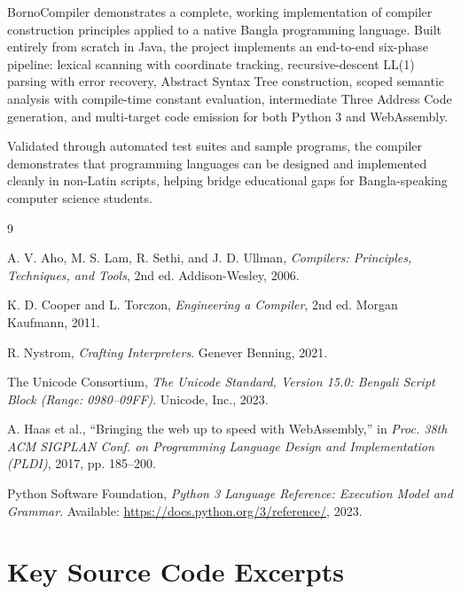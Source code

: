 \documentclass[12pt, a4paper]{report}
\begin{document}
BornoCompiler demonstrates a complete, working implementation of compiler construction principles applied to a native Bangla programming language. Built entirely from scratch in Java, the project implements an end-to-end six-phase pipeline: lexical scanning with coordinate tracking, recursive-descent LL(1) parsing with error recovery, Abstract Syntax Tree construction, scoped semantic analysis with compile-time constant evaluation, intermediate Three Address Code generation, and multi-target code emission for both Python 3 and WebAssembly.

Validated through automated test suites and sample programs, the compiler demonstrates that programming languages can be designed and implemented cleanly in non-Latin scripts, helping bridge educational gaps for Bangla-speaking computer science students.

\begin{thebibliography}{9}

A. V. Aho, M. S. Lam, R. Sethi, and J. D. Ullman,
\textit{Compilers: Principles, Techniques, and Tools}, 2nd ed.
Addison-Wesley, 2006.

K. D. Cooper and L. Torczon,
\textit{Engineering a Compiler}, 2nd ed.
Morgan Kaufmann, 2011.

R. Nystrom,
\textit{Crafting Interpreters}.
Genever Benning, 2021.

The Unicode Consortium,
\textit{The Unicode Standard, Version 15.0: Bengali Script Block (Range: 0980--09FF)}.
Unicode, Inc., 2023.

A. Haas et al.,
``Bringing the web up to speed with WebAssembly,''
in \textit{Proc. 38th ACM SIGPLAN Conf. on Programming Language Design and Implementation (PLDI)}, 2017, pp. 185--200.

Python Software Foundation,
\textit{Python 3 Language Reference: Execution Model and Grammar}.
Available: \url{https://docs.python.org/3/reference/}, 2023.

\end{thebibliography}

\appendix
\chapter{Key Source Code Excerpts}
\end{document}
